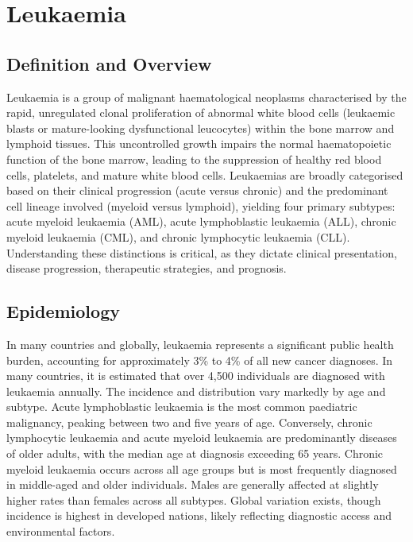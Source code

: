 \chapter{Leukaemia}

\section*{Definition and Overview}
Leukaemia is a group of malignant haematological neoplasms characterised by the rapid, unregulated clonal proliferation of abnormal white blood cells (leukaemic blasts or mature-looking dysfunctional leucocytes) within the bone marrow and lymphoid tissues. This uncontrolled growth impairs the normal haematopoietic function of the bone marrow, leading to the suppression of healthy red blood cells, platelets, and mature white blood cells. Leukaemias are broadly categorised based on their clinical progression (acute versus chronic) and the predominant cell lineage involved (myeloid versus lymphoid), yielding four primary subtypes: acute myeloid leukaemia (AML), acute lymphoblastic leukaemia (ALL), chronic myeloid leukaemia (CML), and chronic lymphocytic leukaemia (CLL). Understanding these distinctions is critical, as they dictate clinical presentation, disease progression, therapeutic strategies, and prognosis.

\section*{Epidemiology}
In many countries and globally, leukaemia represents a significant public health burden, accounting for approximately 3\% to 4\% of all new cancer diagnoses. In many countries, it is estimated that over 4,500 individuals are diagnosed with leukaemia annually. The incidence and distribution vary markedly by age and subtype. Acute lymphoblastic leukaemia is the most common paediatric malignancy, peaking between two and five years of age. Conversely, chronic lymphocytic leukaemia and acute myeloid leukaemia are predominantly diseases of older adults, with the median age at diagnosis exceeding 65 years. Chronic myeloid leukaemia occurs across all age groups but is most frequently diagnosed in middle-aged and older individuals. Males are generally affected at slightly higher rates than females across all subtypes. Global variation exists, though incidence is highest in developed nations, likely reflecting diagnostic access and environmental factors.

